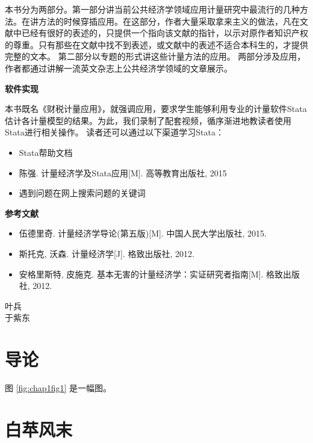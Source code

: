 \documentclass[]{ctexbook}
\providecommand{\tightlist}{%
  \setlength{\itemsep}{0pt}\setlength{\parskip}{0pt}}
\begin{document}
本书分为两部分。第一部分讲当前公共经济学领域应用计量研究中最流行的几种方法。在讲方法的时候穿插应用。在这部分，作者大量采取拿来主义的做法，凡在文献中已经有很好的表述的，只提供一个指向该文献的指针，以示对原作者知识产权的尊重。只有那些在文献中找不到表述，或文献中的表述不适合本科生的，才提供完整的文本。
第二部分以专题的形式讲这些计量方法的应用。
两部分涉及应用，作者都通过讲解一流英文杂志上公共经济学领域的文章展示。

\textbf{软件实现}

本书既名《财税计量应用》，就强调应用，要求学生能够利用专业的计量软件Stata估计各计量模型的结果。为此，我们录制了配套视频，循序渐进地教读者使用Stata进行相关操作。
读者还可以通过以下渠道学习Stata：

\begin{itemize}
\tightlist
\item
  Stata帮助文档
\item
  陈强. 计量经济学及Stata应用{[}M{]}. 高等教育出版社, 2015
\item
  遇到问题在网上搜索问题的关键词
\end{itemize}

\textbf{参考文献}

\begin{itemize}
\tightlist
\item
  伍德里奇. 计量经济学导论(第五版){[}M{]}. 中国人民大学出版社, 2015.
\item
  斯托克, 沃森. 计量经济学{[}J{]}. 格致出版社, 2012.
\item
  安格里斯特, 皮施克. 基本无害的计量经济学：实证研究者指南{[}M{]}. 格致出版社, 2012.
\end{itemize}

\begin{flushright}
叶兵\\
于紫东\\
\end{flushright}

\mainmatter

\hypertarget{intro}{%
\chapter{导论}\label{intro}}

图 \ref{fig:chap1fig1} 是一幅图。

\hypertarget{wind}{%
\chapter{白苹风末}\label{wind}}
\end{document}
